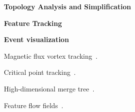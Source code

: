 {\bf Topology Analysis and Simplification}\quad

{\bf Feature Tracking}\quad

{\bf Event visualization}\quad





Magnetic flux vortex tracking~\cite{GuoPPKG16, GuoPG17, PhillipsGPKG16, PhillipsPKG15}.

Critical point tracking~\cite{ReininghausKWH12}.

High-dimensional merge tree~\cite{OesterlingHWMS17}. 

Feature flow fields~\cite{TheiselS03}. 
